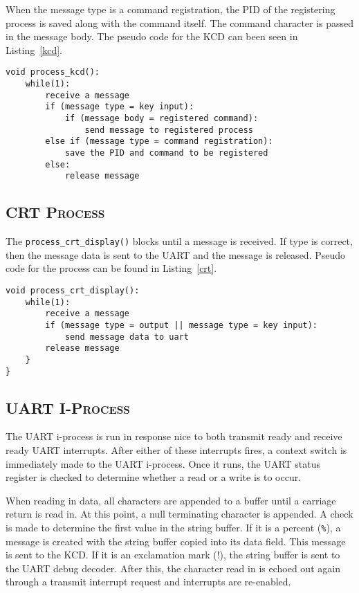 \documentclass[oneside]{report}
\begin{document}
When the message type is a command registration, the PID of the
registering process is saved along with the command itself. The
command character is passed in the message body. The pseudo code for
the KCD can been seen in Listing~\ref{kcd}.

\begin{lstlisting}
void process_kcd():
    while(1):
        receive a message
        if (message type = key input):
            if (message body = registered command):
                send message to registered process
        else if (message type = command registration):
            save the PID and command to be registered
        else:
            release message
\end{lstlisting}

\subsection{\textsc{CRT Process}}
The \texttt{process\_crt\_display()} blocks until a message is
received. If type is correct, then the message data is sent to the
UART and the message is released. Pseudo code for the
process can be found in Listing~\ref{crt}.

\begin{lstlisting}
void process_crt_display():
    while(1):
        receive a message
        if (message type = output || message type = key input):
            send message data to uart
        release message
    }
}
\end{lstlisting}

\subsection{\textsc{UART I-Process}}
The UART i-process is run in response nice to both transmit ready and
receive ready UART interrupts. After either of these interrupts fires,
a context switch is immediately made to the UART i-process. Once it
runs, the UART status register is checked to determine whether a read
or a write is to occur.

When reading in data, all characters are appended to a buffer until a carriage
return is read in. At this point, a null terminating character is appended.  A
check is made to determine the first value in the string buffer. If it is a
percent (\texttt{\%}), a message is created with the string buffer copied into its data
field. This message is sent to the KCD. If it is an exclamation mark (!), the
string buffer is sent to the UART debug decoder. After this, the character read
in is echoed out again through a transmit interrupt request and interrupts are
re-enabled. 
\end{document}
